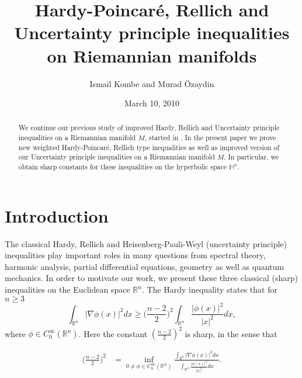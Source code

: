 \documentclass[12pt]{amsart}
\date {March 10, 2010}
\numberwithin{equation}{section}
\numberwithin{theorem}{section}
\numberwithin{theorem}{section} \numberwithin{lemma}{section}
\numberwithin{definition}{section}
\numberwithin{corollary}{section}
\numberwithin{remark}{section}
\numberwithin{proposition}{section}
\begin{document}
 \setcounter{page}{1}
\title{Hardy-Poincar\'e, Rellich and Uncertainty principle  inequalities on Riemannian manifolds}
\author{Ismail Kombe and Murad \"Ozaydin}
\dedicatory {}
\address{Ismail Kombe, Mathematics Department\\ Dawson-Loeffler Science
\&Mathematics Bldg\\
Oklahoma City University \\
2501 N. Blackwelder, Oklahoma City, OK 73106-1493}
\address{Murad Ozaydin, Mathematics Department\\ University of
Oklahoma, Norman,  OK } 
\begin{abstract}
We continue our previous study of improved Hardy, Rellich and
Uncertainty principle inequalities on a Riemannian manifold $M$,
started in \cite{Kombe-Ozaydin}.
 In the present paper we prove new weighted Hardy-Poincar\'e,  Rellich type inequalities as well as improved version of our Uncertainty principle inequalities on  a Riemannian manifold $M$. In particular,  we obtain sharp constants for
 these inequalities on the hyperbolic space $\mathbb{H}^n$.
\end{abstract}
\maketitle
\section{Introduction}

The classical Hardy, Rellich and Heisenberg-Pauli-Weyl (uncertainty
principle) inequalities  play important roles in many questions
from spectral theory, harmonic analysis, partial differential equations, geometry
 as well as quantum mechanics. In order to motivate
our work, we present these three  classical (sharp) inequalities
on the Euclidean space $\mathbb{R}^n$. The Hardy inequality states
that for $n\ge 3$
\begin{equation}
\int_{\mathbb{R}^n}|\nabla\phi(x)|^2dx\ge
\Big(\frac{n-2}{2}\Big)^2\int_{\mathbb{R}^n}
\frac{|\phi(x)|^2}{|x|^2}dx,
\end{equation}
where $\phi\in C_0^{\infty}( \mathbb{R}^n)$.  Here the constant
$(\frac{n-2}{2})^2$ is  sharp, in the sense that

\[\begin{aligned}\Big(\frac{n-2}{2}\Big)^2 &=
\inf_{0\neq \phi\in
C_0^{\infty}(\mathbb{R}^n)}\frac{\int_{\mathbb{R}^n}|\nabla
\phi(x)|^2dx}{\int_{\mathbb{R}^n}\frac{|\phi(x)|^2}{|x|^2}dx}.
\end{aligned}\]
\end{document}
